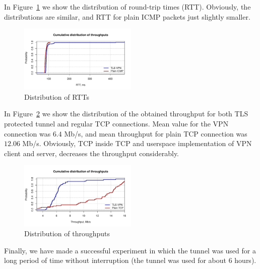 In Figure~\ref{fig:rtt} we show the distribution of round-trip times
(RTT). Obviously, the distributions are similar, and RTT for
plain ICMP packets just slightly smaller.

\begin{figure}[!h]
        \includegraphics[width=0.5\textwidth]{graphics/rtt.pdf}
        \caption{Distribution of RTTs}
        \label{fig:rtt}
\end{figure}

In Figure~\ref{fig:iperf_distr} we show the distribution of the obtained throughput for both
TLS protected tunnel and regular TCP connections. Mean value for the VPN connection was 
$6.4$ Mb/s, and mean throughput for plain TCP connection was $12.06$ Mb/s. Obviously, 
TCP inside TCP and userspace implementation of VPN client and server, decreases the 
throughput considerably.

\begin{figure}[!h]
        \includegraphics[width=0.5\textwidth]{graphics/throughput.pdf}
        \caption{Distribution of throughputs}
        \label{fig:iperf_distr}
\end{figure}

Finally, we have made a successful experiment in which the tunnel was used for a long period of time
without interruption (the tunnel was used for about 6 hours).

